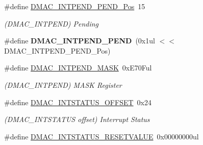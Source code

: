 \begin{DoxyCompactItemize}
\item 
\hypertarget{group___s_a_m_l21___d_m_a_c_gac3d6faad2db70aa17d0fe5ef6129cbe0}{}\#define \hyperlink{group___s_a_m_l21___d_m_a_c_gac3d6faad2db70aa17d0fe5ef6129cbe0}{D\+M\+A\+C\+\_\+\+I\+N\+T\+P\+E\+N\+D\+\_\+\+P\+E\+N\+D\+\_\+\+Pos}~15\label{group___s_a_m_l21___d_m_a_c_gac3d6faad2db70aa17d0fe5ef6129cbe0}

\begin{DoxyCompactList}\small\item\em (D\+M\+A\+C\+\_\+\+I\+N\+T\+P\+E\+N\+D) Pending \end{DoxyCompactList}\item 
\hypertarget{group___s_a_m_l21___d_m_a_c_ga4c7c13a292cb0fa8bde7c7cddbe762a1}{}\#define {\bfseries D\+M\+A\+C\+\_\+\+I\+N\+T\+P\+E\+N\+D\+\_\+\+P\+E\+N\+D}~(0x1ul $<$$<$ D\+M\+A\+C\+\_\+\+I\+N\+T\+P\+E\+N\+D\+\_\+\+P\+E\+N\+D\+\_\+\+Pos)\label{group___s_a_m_l21___d_m_a_c_ga4c7c13a292cb0fa8bde7c7cddbe762a1}

\item 
\hypertarget{group___s_a_m_l21___d_m_a_c_gaee3984e5ea7704a57c5ef7ffd0745d04}{}\#define \hyperlink{group___s_a_m_l21___d_m_a_c_gaee3984e5ea7704a57c5ef7ffd0745d04}{D\+M\+A\+C\+\_\+\+I\+N\+T\+P\+E\+N\+D\+\_\+\+M\+A\+S\+K}~0x\+E70\+Ful\label{group___s_a_m_l21___d_m_a_c_gaee3984e5ea7704a57c5ef7ffd0745d04}

\begin{DoxyCompactList}\small\item\em (D\+M\+A\+C\+\_\+\+I\+N\+T\+P\+E\+N\+D) M\+A\+S\+K Register \end{DoxyCompactList}\item 
\hypertarget{group___s_a_m_l21___d_m_a_c_gab5e60b5131f13474e46568eae4474ddb}{}\#define \hyperlink{group___s_a_m_l21___d_m_a_c_gab5e60b5131f13474e46568eae4474ddb}{D\+M\+A\+C\+\_\+\+I\+N\+T\+S\+T\+A\+T\+U\+S\+\_\+\+O\+F\+F\+S\+E\+T}~0x24\label{group___s_a_m_l21___d_m_a_c_gab5e60b5131f13474e46568eae4474ddb}

\begin{DoxyCompactList}\small\item\em (D\+M\+A\+C\+\_\+\+I\+N\+T\+S\+T\+A\+T\+U\+S offset) Interrupt Status \end{DoxyCompactList}\item 
\hypertarget{group___s_a_m_l21___d_m_a_c_ga5a99d189f9132d4979a561949b4c17a9}{}\#define \hyperlink{group___s_a_m_l21___d_m_a_c_ga5a99d189f9132d4979a561949b4c17a9}{D\+M\+A\+C\+\_\+\+I\+N\+T\+S\+T\+A\+T\+U\+S\+\_\+\+R\+E\+S\+E\+T\+V\+A\+L\+U\+E}~0x00000000ul\label{group___s_a_m_l21___d_m_a_c_ga5a99d189f9132d4979a561949b4c17a9}


\end{DoxyCompactItemize}
